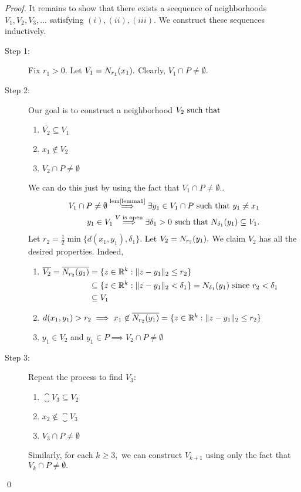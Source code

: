 \begin{proof}
    It remains to show that there exists a seequence of neighborhoods $V_1, V_2, V_3, ...$ satisfying $(i),(ii),(iii)$. We construct these sequences inductively.

    \begin{description}
        \item[Step 1:] Fix $r_1 > 0.$ Let $V_1 = N_{r_1}(x_1).$ Clearly, $V_1 \cap P \not = \emptyset$.
        \item[Step 2:] Our goal is to construct a neighborhood $V_2 \text{ such that }$
        \begin{enumerate}[$(i)$]
            \item $\overline{V_2} \subseteq V_1$
            \item $x_1 \not \in V_2$
            \item $V_2 \cap P \not = \emptyset$
        \end{enumerate}
        We can do this just by using the fact that $V_1 \cap P \not = \emptyset.$.
        \begin{align*}
            V_1 \cap P \not = \emptyset \overset{\text{lem\ref{lemma1}}}{\implies} \exists y_1 \in V_1 \cap P \text{ such that } y_1 \not = x_1 \\
            y_1 \in V_1 \overset{V \text{ is open}}{\implies} \exists \delta_1 > 0 \text{ such that } N_{\delta_1}(y_1) \subseteq V_1.
        \end{align*}
        Let $r_2 = \frac{1}{2} \min\{d(x_1,y_1), \delta_1\}.$ Let $V_2 = N_{r_2}(y_1).$ We claim $V_2$ has all the desired properties. Indeed,
        \begin{enumerate}[$(i)$]
            \item $\begin{aligned}[t]
                \overline{V_2} = \overline{N_{r_2}(y_1)} &= \{z \in \mathbb{R}^k : \|z-y_1\|_2 \leq r_2\} \\
                &\subseteq \{z\in \mathbb{R}^k : \|z-y_1\|_2 < \delta_1\} = N_{\delta_1}(y_1) \text{ since $r_2 < \delta_1$}\\
                &\subseteq V_1
            \end{aligned}$
            \item$d(x_1, y_1) > r_2 \implies x_1 \not \in \overline{N_{r_2}(y_1)} = \{z\in \mathbb{R}^k : \|z-y_1\|_2 \leq r_2\}$
            \item $y_1 \in V_2$ and $y_1 \in P \implies V_2 \cap P \not = \emptyset$
        \end{enumerate}

        \item[Step 3:] Repeat the process to find $V_3$:
        \begin{enumerate}[$(i)$]
            \item $\closure{V_3} \subseteq V_2$
            \item $x_2 \not \in \closure{V_3}$
            \item $V_3 \cap P \not = \emptyset$
        \end{enumerate}
        Similarly, for each $k \geq 3,$ we can construct $V_{k+1}$ using only the fact that $V_k \cap P \not = \emptyset.$
    \end{description}
    \qed
\end{proof}

